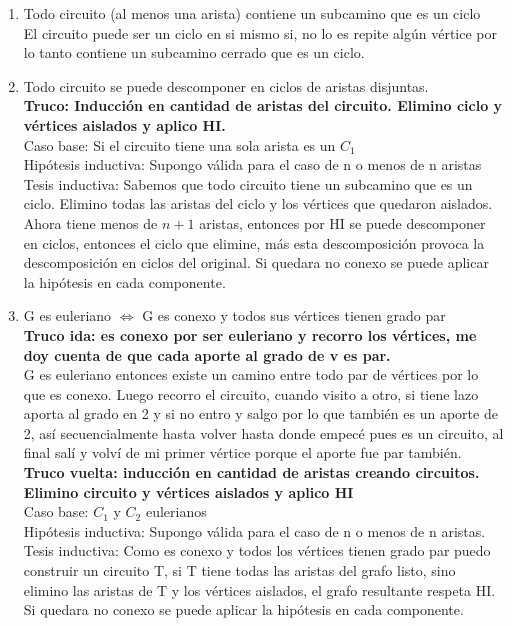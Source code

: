 \documentclass{article}
\begin{document}
\begin{enumerate}
    \item Todo circuito (al menos una arista) contiene un subcamino que es un ciclo \\
    El circuito puede ser un ciclo en si mismo si, no lo es repite algún vértice por lo tanto contiene un subcamino cerrado que es un ciclo. 
    
    \item Todo circuito se puede descomponer en ciclos de aristas disjuntas. \\
    \textbf{Truco: Inducción en cantidad de aristas del circuito. Elimino ciclo y vértices aislados y aplico HI.} \\
    Caso base: Si el circuito tiene una sola arista es un $C_1$ \\
    Hipótesis inductiva: Supongo válida para el caso de n o menos de n aristas \\
    Tesis inductiva: Sabemos que todo circuito tiene un subcamino que es un ciclo. Elimino todas las aristas del ciclo y los vértices que quedaron aislados. Ahora tiene menos de $n+1$ aristas, entonces por HI se puede descomponer en ciclos, entonces el ciclo que elimine, más esta descomposición provoca la descomposición en ciclos del original. Si quedara no conexo se puede aplicar la hipótesis en cada componente.
    
    \item G es euleriano $\iff$ G es conexo y todos sus vértices tienen grado par \\
    \textbf{Truco ida: es conexo por ser euleriano y recorro los vértices, me doy cuenta de que cada aporte al grado de v es par.} \\
    G es euleriano entonces existe un camino entre todo par de vértices por lo que es conexo. Luego recorro el circuito, cuando visito a otro, si tiene lazo aporta al grado en 2 y si no entro y salgo por lo que también es un aporte de 2, así secuencialmente hasta volver hasta donde empecé pues es un circuito, al final salí y volví de mi primer vértice porque el aporte fue par también. \\
    \textbf{Truco vuelta: inducción en cantidad de aristas creando circuitos. Elimino circuito y vértices aislados y aplico HI} \\
    Caso base: $C_1$ y $C_2$ eulerianos \\
    Hipótesis inductiva: Supongo válida para el caso de n o menos de n aristas. \\
    Tesis inductiva: Como es conexo y todos los vértices tienen grado par puedo construir un circuito T, si T tiene todas las aristas del grafo listo, sino elimino las aristas de T y los vértices aislados, el grafo resultante respeta HI. Si quedara no conexo se puede aplicar la hipótesis en cada componente.


\end{enumerate}
\end{document}

